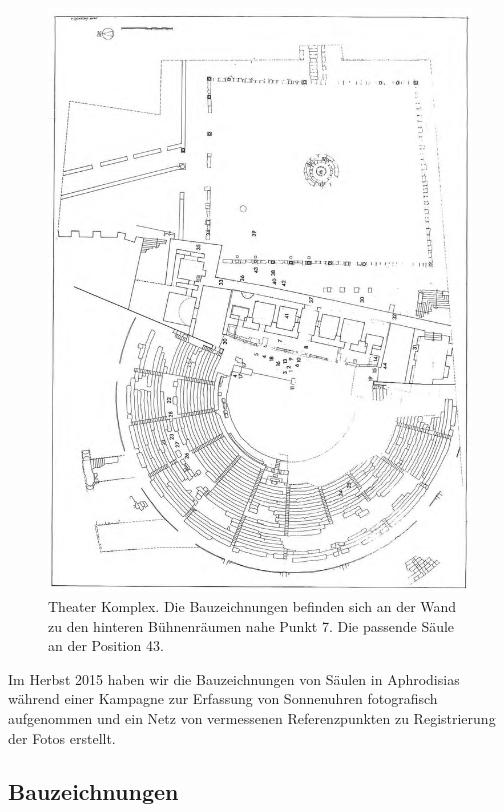 \documentclass[twocolumn]{bmcart}
\begin{document}
\begin{figure}
\centering
\includegraphics[width=1.2\linewidth]{figures/screenshot005}
\caption{Theater Komplex. Die Bauzeichnungen befinden sich an der Wand zu den hinteren Bühnenräumen nahe Punkt 7. Die passende Säule an der Position 43.}
\label{fig:screenshot005}
\end{figure}

Im Herbst 2015 haben wir die Bauzeichnungen  von Säulen in Aphrodisias während einer Kampagne zur  Erfassung von Sonnenuhren  fotografisch aufgenommen  und ein Netz von vermessenen Referenzpunkten zu Registrierung der Fotos erstellt.

\subsection{Bauzeichnungen}
\end{document}
